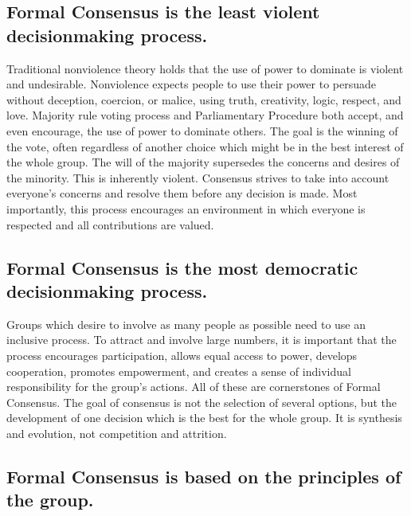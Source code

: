 \subsection*{Formal Consensus is the least violent decisionmaking process.} %
\label{sub:formal_consensus_is_the_least_violent_decisionmakingdecisionmaking_process_}
Traditional nonviolence theory holds that the use of power to
dominate is violent and undesirable. Nonviolence expects people to
use their power to persuade without deception, coercion, or malice,
using truth, creativity, logic, respect, and love. Majority rule
voting process and Parliamentary Procedure both accept, and even
encourage, the use of power to dominate others. The goal is the
winning of the vote, often regardless of another choice which
might be in the best interest of the whole group. The will of the
majority supersedes the concerns and desires of the minority. This
is inherently violent. Consensus strives to take into account
everyone's concerns and resolve them before any decision is
made. Most importantly, this process encourages an environment in
which everyone is respected and all contributions are valued.


\subsection*{Formal Consensus is the most democratic decisionmaking process.}

Groups which desire to involve as many people as possible need to
use an inclusive process. To attract and involve large numbers, it
is important that the process encourages participation, allows
equal access to power, develops cooperation, promotes empowerment,
and creates a sense of individual responsibility for the group's
actions. All of these are cornerstones of Formal Consensus. The
goal of consensus is not the selection of several options, but the
development of one decision which is the best for the whole
group. It is synthesis and evolution, not competition and
attrition.

\subsection*{Formal Consensus is based on the principles of the group.}

